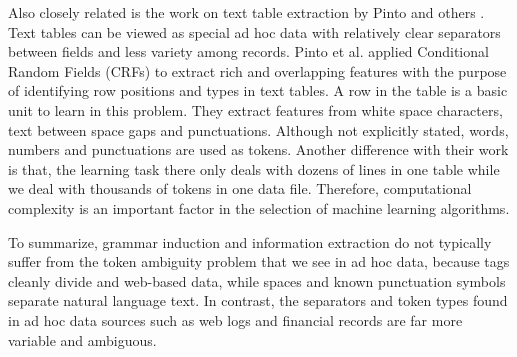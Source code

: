 Also closely related is the work on text table extraction by
Pinto and others \cite{Pinto+:texttables}. Text tables can
be viewed as special ad hoc data with relatively clear separators between
fields and less variety among records. Pinto et al. applied
Conditional Random Fields (CRFs) to extract rich and overlapping features
with the purpose of identifying row positions and types in text
tables. A row in the table is a basic unit to learn in this
problem. They extract features from white space characters,
text between space gaps and punctuations. Although not explicitly
stated, words, numbers and punctuations are used as tokens. Another
difference with their work is that, the
learning task there only deals with dozens of lines in one table while 
we deal with thousands of tokens in one data file. 
Therefore, computational complexity is an important factor in 
the selection of machine learning algorithms. 

To summarize, grammar induction and information extraction do not 
typically suffer from the token ambiguity problem that 
we see in ad hoc data, because tags cleanly divide \xml{} and web-based data, 
while spaces and known punctuation symbols separate natural language text.
In contrast, the separators and token types found in ad hoc data sources such as
web logs and financial records are far more variable and ambiguous.  


